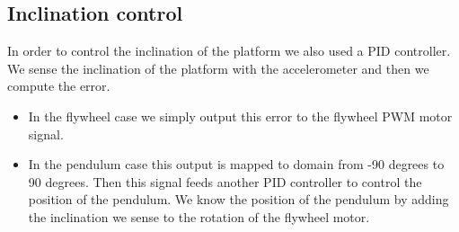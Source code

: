 \subsection{Inclination control}
In order to control the inclination of the platform we also used a PID controller.
We sense the inclination of the platform with the accelerometer and then we compute the error.
\begin{itemize}
    \item In the flywheel case we simply output this error to the flywheel PWM motor signal.
    \item In the pendulum case this output is mapped to domain from -90 degrees to 90 degrees.
    Then this signal feeds another PID controller to control the position of the pendulum. We know
    the position of the pendulum by adding the inclination we sense to the rotation of the flywheel motor.
\end{itemize}
